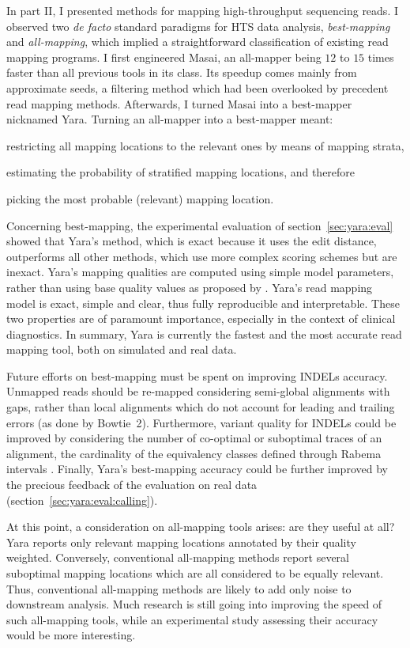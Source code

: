 In part II, I presented methods for mapping high-throughput sequencing reads.
I observed two \emph{de facto} standard paradigms for HTS data analysis, \emph{best-mapping} and \emph{all-mapping}, which implied a straightforward classification of existing read mapping programs.
I first engineered Masai, an all-mapper being $12$ to $15$ times faster than all previous tools in its class.
Its speedup comes mainly from approximate seeds, a filtering method which had been overlooked by precedent read mapping methods.
Afterwards, I turned Masai into a best-mapper nicknamed Yara.
Turning an all-mapper into a best-mapper meant:
\begin{inparaenum}[(i)]
\item restricting all mapping locations to the relevant ones by means of mapping strata,
\item estimating the probability of stratified mapping locations, and therefore 
\item picking the most probable (\ie relevant) mapping location.
\end{inparaenum}

Concerning best-mapping, the experimental evaluation of section~\ref{sec:yara:eval} showed that Yara's method, which is exact because it uses the edit distance, outperforms all other methods, which use more complex scoring schemes but are inexact.
Yara's mapping qualities are computed using simple model parameters, rather than using base quality values as proposed by \cite{Li2009}.
Yara's read mapping model is exact, simple and clear, thus fully reproducible and interpretable.
These two properties are of paramount importance, especially in the context of clinical diagnostics.
In summary, Yara is currently the fastest and the most accurate read mapping tool, both on simulated and real data.

Future efforts on best-mapping must be spent on improving INDELs accuracy.
Unmapped reads should be re-mapped considering semi-global alignments with gaps, rather than local alignments which do not account for leading and trailing errors (\eg as done by Bowtie~2).
Furthermore, variant quality for INDELs could be improved by considering the number of co-optimal or suboptimal traces of an alignment, \ie the cardinality of the equivalency classes defined through Rabema intervals \citep{Holtgrewe2011}.
Finally, Yara's best-mapping accuracy could be further improved by the precious feedback of the evaluation on real data (section~\ref{sec:yara:eval:calling}).

At this point, a consideration on all-mapping tools arises: are they useful at all?
Yara reports only relevant mapping locations annotated by their quality \ie weighted.
Conversely, conventional all-mapping methods report several suboptimal mapping locations which are all considered to be equally relevant.
Thus, conventional all-mapping methods are likely to add only noise to downstream analysis.
Much research is still going into improving the speed of such all-mapping tools, while an experimental study assessing their accuracy would be more interesting.
